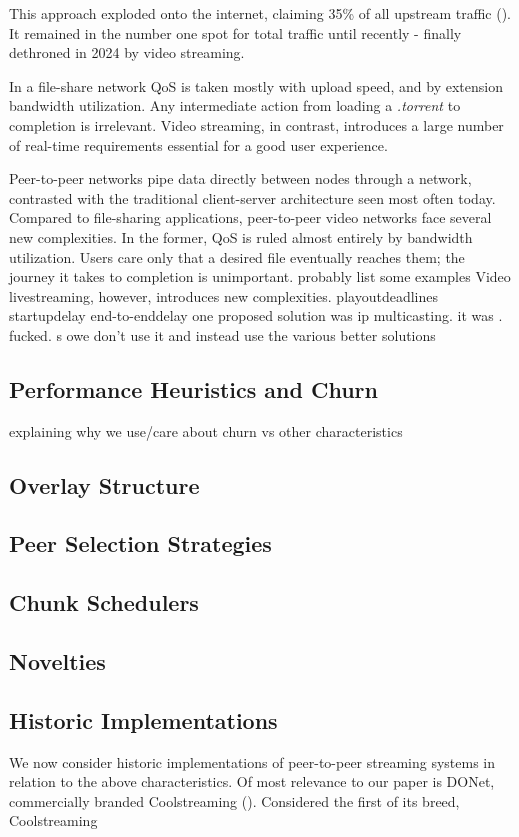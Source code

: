 \documentclass[]{article}
\begin{document}
This approach exploded onto the internet, claiming 35\% of all upstream traffic (\cite{archiveCacheLogicResearch}). It remained in the number one spot for total traffic until recently - finally dethroned in 2024 by video streaming. 

In a file-share network QoS is taken mostly with upload speed, and by extension bandwidth utilization. Any intermediate action from loading a \textit{.torrent} to completion is irrelevant. Video streaming, in contrast, introduces a large number of real-time requirements essential for a good user experience.



Peer-to-peer networks pipe data directly between nodes through a network, contrasted with the traditional client-server architecture seen most often today.  Compared to file-sharing applications, peer-to-peer video networks face several new complexities. In the former, QoS is ruled almost entirely by bandwidth utilization. Users care only that a desired file eventually reaches them; the journey it takes to completion is unimportant.  probably list some examples Video livestreaming, however, introduces new complexities. playoutdeadlines startupdelay end-to-enddelay
one proposed solution was ip multicasting. it was . fucked. s owe don't use it and instead use the various better solutions
\subsection{Performance Heuristics and Churn}
explaining why we use/care about churn vs other characteristics
\subsection{Overlay Structure}
\subsection{Peer Selection Strategies}
\subsection{Chunk Schedulers}
\subsection{Novelties}
\subsection{Historic Implementations}
We now consider historic implementations of peer-to-peer streaming systems in relation to the above characteristics. Of most relevance to our paper is DONet, commercially branded Coolstreaming (\cite{1498486}). Considered the first of its breed, Coolstreaming 
\end{document}
